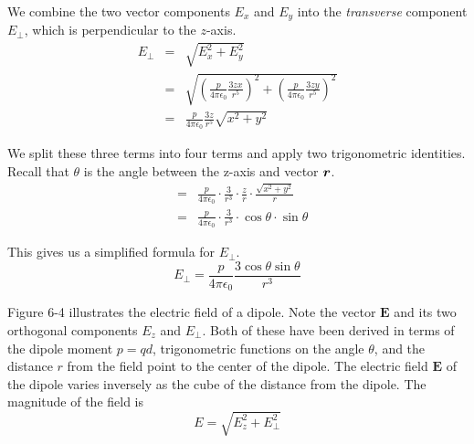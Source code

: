We combine the two vector components $E_x$ and $E_y$ 
into the \emph{transverse} component $E_{\perp}$, which is perpendicular to the $z$-axis.
\begin{eqnarray*}
  E_{\perp} &=& \sqrt{E_x^2 + E_y^2} \\
  &=& \sqrt{\left(\frac{p}{4\pi\epsilon_0}\frac{3zx}{r^5}\right)^2 
    + \left(\frac{p}{4\pi\epsilon_0}\frac{3zy}{r^5}\right)^2} \\
  &=& \frac{p}{4\pi\epsilon_0}\frac{3z}{r^5}\sqrt{x^2 + y^2} 
\end{eqnarray*}

We split these three terms into four terms and apply two trigonometric identities.
Recall that $\theta$ is the angle between the z-axis and vector $\boldsymbol{r}$.
\begin{eqnarray*}
  &=& \frac{p}{4\pi\epsilon_0} \cdot \frac{3}{r^3} \cdot \frac{z}{r}
    \cdot \frac{\sqrt{x^2 + y^2}}{r} \\
  &=& \frac{p}{4\pi\epsilon_0} \cdot \frac{3}{r^3} \cdot \cos\theta \cdot \sin\theta
\end{eqnarray*}

This gives us a simplified formula for $E_{\perp}$.
\begin{equation}
  E_{\perp} = \frac{p}{4\pi\epsilon_0} \frac{3 \cos\theta \sin\theta}{r^3}
\end{equation}

Figure 6-4 illustrates the electric field of a dipole.
Note the vector $\boldsymbol{E}$ and its two orthogonal components $E_z$ and $E_{\perp}$.
Both of these have been derived in terms of the dipole moment $p=qd$,
trigonometric functions on the angle $\theta$,
and the distance $r$ from the field point to the center of the dipole.
The electric field $\boldsymbol{E}$ of the dipole
varies inversely as the cube of the distance from the dipole.
The magnitude of the field is
\begin{equation*}
  E = \sqrt{E_z^2 + E_{\perp}^2}
\end{equation*}

